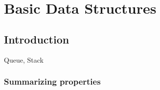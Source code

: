 \chapter{Basic Data Structures}


\section{Introduction}
Queue, Stack


\subsection{Summarizing properties}

